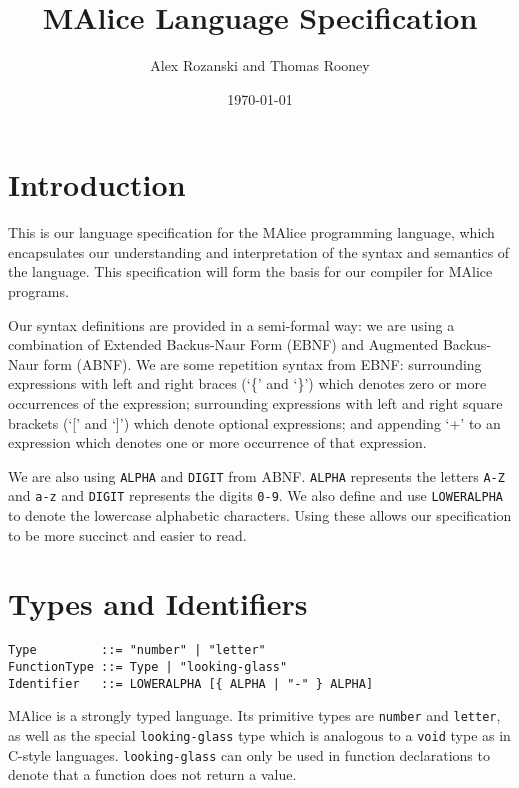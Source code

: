 \documentclass[a4wide, 11pt]{article}
\begin{document}
\title{MAlice Language Specification}

\author{Alex Rozanski and Thomas Rooney}

\date{\today}         %

\maketitle            %

\section{Introduction}

This is our language specification for the MAlice programming language, which encapsulates our understanding and interpretation of the syntax and semantics of the language. This specification will form the basis for our compiler for MAlice programs.

Our syntax definitions are provided in a semi-formal way: we are using a combination of Extended Backus-Naur Form (EBNF) and Augmented Backus-Naur form (ABNF). We are some repetition syntax from EBNF: surrounding expressions with left and right braces (`\{' and `\}') which denotes zero or more occurrences of the expression; surrounding expressions with left and right square brackets (`[' and `]') which denote optional expressions; and appending `+' to an expression which denotes one or more occurrence of that expression.

We are also using \texttt{ALPHA} and \texttt{DIGIT} from ABNF. \texttt{ALPHA} represents the letters \texttt{A-Z} and \texttt{a-z} and \texttt{DIGIT} represents the digits \texttt{0-9}. We also define and use \texttt{LOWERALPHA} to denote the lowercase alphabetic characters. Using these allows our specification to be more succinct and easier to read.

\section{Types and Identifiers}

\begin{verbatim}
Type         ::= "number" | "letter"
FunctionType ::= Type | "looking-glass"
Identifier   ::= LOWERALPHA [{ ALPHA | "-" } ALPHA]
\end{verbatim}

MAlice is a strongly typed language. Its primitive types are \texttt{number} and \texttt{letter}, as well as the special \texttt{looking-glass} type which is analogous to a \texttt{void} type as in C-style languages. \texttt{looking-glass} can only be used in function declarations to denote that a function does not return a value.
\end{document}
